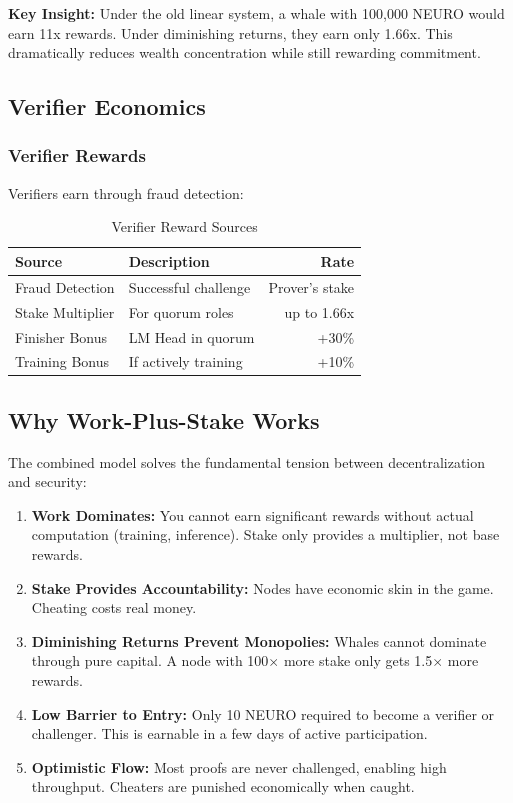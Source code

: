 \documentclass[11pt,a4paper]{article}
\begin{document}
\textbf{Key Insight:} Under the old linear system, a whale with 100,000 NEURO would earn 11x rewards. Under diminishing returns, they earn only 1.66x. This dramatically reduces wealth concentration while still rewarding commitment.

\subsection{Verifier Economics}

\subsubsection{Verifier Rewards}
Verifiers earn through fraud detection:

\begin{table}[H]
\centering
\caption{Verifier Reward Sources}
\begin{tabular}{@{}llr@{}}
\toprule
\textbf{Source} & \textbf{Description} & \textbf{Rate} \\
\midrule
Fraud Detection & Successful challenge & Prover's stake \\
Stake Multiplier & For quorum roles & up to 1.66x \\
Finisher Bonus & LM Head in quorum & +30\% \\
Training Bonus & If actively training & +10\% \\
\bottomrule
\end{tabular}
\end{table}

\subsection{Why Work-Plus-Stake Works}

The combined model solves the fundamental tension between decentralization and security:

\begin{enumerate}
    \item \textbf{Work Dominates:} You cannot earn significant rewards without actual computation (training, inference). Stake only provides a multiplier, not base rewards.
    
    \item \textbf{Stake Provides Accountability:} Nodes have economic skin in the game. Cheating costs real money.
    
    \item \textbf{Diminishing Returns Prevent Monopolies:} Whales cannot dominate through pure capital. A node with 100$\times$ more stake only gets 1.5$\times$ more rewards.
    
    \item \textbf{Low Barrier to Entry:} Only 10 NEURO required to become a verifier or challenger. This is earnable in a few days of active participation.
    
    \item \textbf{Optimistic Flow:} Most proofs are never challenged, enabling high throughput. Cheaters are punished economically when caught.
\end{enumerate}
\end{document}
